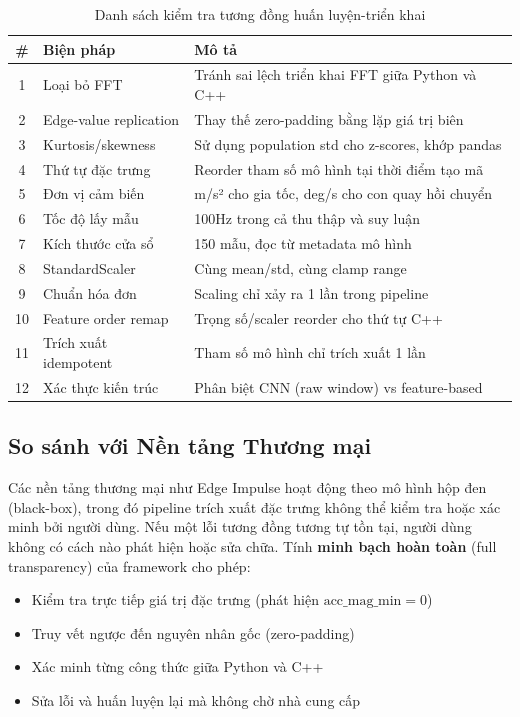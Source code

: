 \begin{table}[H]
    \centering
    \caption{Danh sách kiểm tra tương đồng huấn luyện-triển khai}
    \small
    \begin{tabular}{@{}clp{7cm}@{}}
        \toprule
        \# & Biện pháp & Mô tả \\
        \midrule
        1 & Loại bỏ FFT & Tránh sai lệch triển khai FFT giữa Python và C++ \\
        2 & Edge-value replication & Thay thế zero-padding bằng lặp giá trị biên \\
        3 & Kurtosis/skewness & Sử dụng population std cho z-scores, khớp pandas \\
        4 & Thứ tự đặc trưng & Reorder tham số mô hình tại thời điểm tạo mã \\
        5 & Đơn vị cảm biến & m/s² cho gia tốc, deg/s cho con quay hồi chuyển \\
        6 & Tốc độ lấy mẫu & 100Hz trong cả thu thập và suy luận \\
        7 & Kích thước cửa sổ & 150 mẫu, đọc từ metadata mô hình \\
        8 & StandardScaler & Cùng mean/std, cùng clamp range \\
        9 & Chuẩn hóa đơn & Scaling chỉ xảy ra 1 lần trong pipeline \\
        10 & Feature order remap & Trọng số/scaler reorder cho thứ tự C++ \\
        11 & Trích xuất idempotent & Tham số mô hình chỉ trích xuất 1 lần \\
        12 & Xác thực kiến trúc & Phân biệt CNN (raw window) vs feature-based \\
        \bottomrule
    \end{tabular}
    \label{tab:parity_checklist}
\end{table}

\subsection{So sánh với Nền tảng Thương mại}
Các nền tảng thương mại như Edge Impulse hoạt động theo mô hình hộp đen (black-box), trong đó pipeline trích xuất đặc trưng không thể kiểm tra hoặc xác minh bởi người dùng. Nếu một lỗi tương đồng tương tự tồn tại, người dùng không có cách nào phát hiện hoặc sửa chữa. Tính \textbf{minh bạch hoàn toàn} (full transparency) của framework cho phép:
\begin{itemize}
    \item Kiểm tra trực tiếp giá trị đặc trưng (phát hiện $\text{acc\_mag\_min} = 0$)
    \item Truy vết ngược đến nguyên nhân gốc (zero-padding)
    \item Xác minh từng công thức giữa Python và C++
    \item Sửa lỗi và huấn luyện lại mà không chờ nhà cung cấp
\end{itemize}

